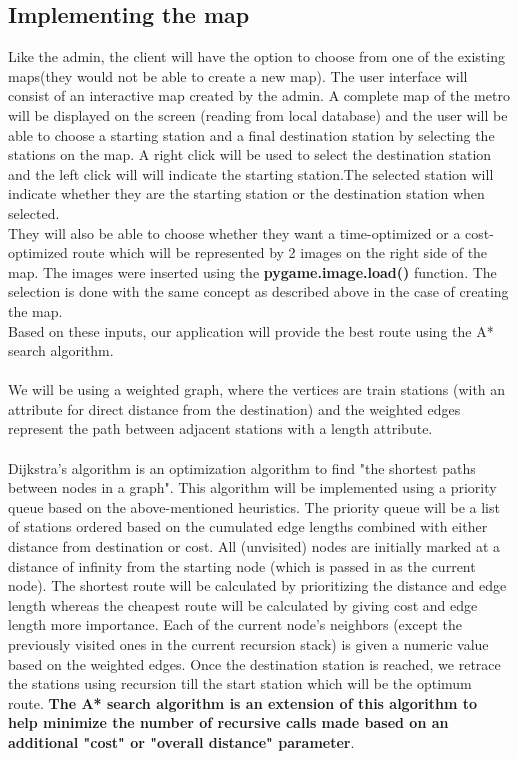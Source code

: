 \documentclass[fontsize=11pt]{article}
\begin{document}
    \subsection*{Implementing the map}
    Like the admin, the client will have the option to choose from one of the existing maps(they would not be able to create a new map). The user interface will consist of an interactive map created by the admin. A complete map of the metro will be displayed on the screen (reading from local database) and the user will be able to choose a starting station and a final destination station by selecting the stations on the map. A right click will be used to select the destination station and the left click will will indicate the starting station.The selected station will indicate whether they are the starting station or the destination station when selected.\\
    They will also be able to choose whether they want a time-optimized or a cost-optimized route which will be represented by 2 images on the right side of the map. The images were inserted using the \textbf{pygame.image.load()} function. The selection is done with the same concept as described above in the case of creating the map.\\
    Based on these inputs, our application will provide the best route using the A* search algorithm.\\
    \\
    We will be using a weighted graph, where the vertices are train stations (with an attribute for direct distance from the destination) and the weighted edges represent the path between adjacent stations with a length attribute. \\
    \\
    Dijkstra's algorithm is an optimization algorithm to find "the shortest paths between nodes in a graph". This algorithm will be implemented using a priority queue based on the above-mentioned heuristics. The priority queue will be a list of stations ordered based on the cumulated edge lengths combined with either distance from destination or cost. All (unvisited) nodes are initially marked at a distance of infinity from the starting node (which is passed in as the current node). The shortest route will be calculated by prioritizing the distance and edge length whereas the cheapest route will be calculated by giving cost and edge length more importance. Each of the current node's neighbors (except the previously visited ones in the current recursion stack) is given a numeric value based on the weighted edges. Once the destination station is reached, we retrace the stations using recursion till the start station which will be the optimum route. \textbf{The A* search algorithm is an extension of this algorithm to help minimize the number of recursive calls made based on an additional "cost" or "overall distance" parameter}.\\
\end{document}
